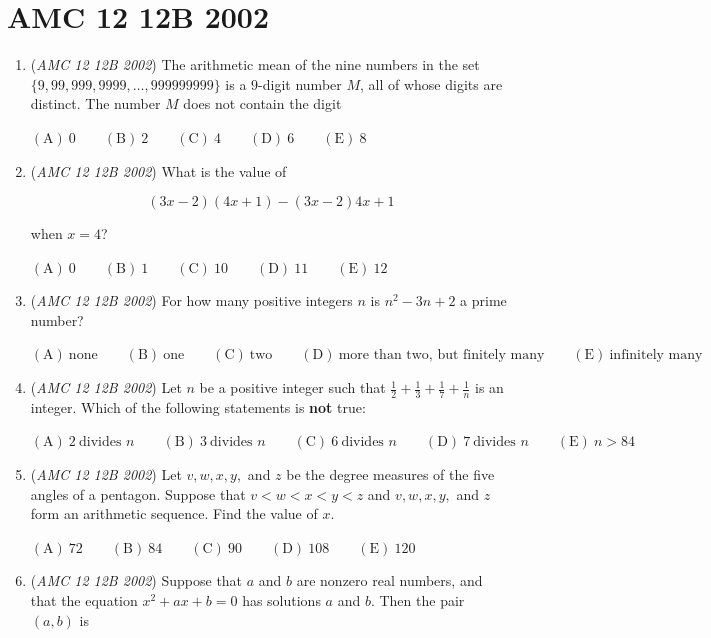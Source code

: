 \section{AMC 12 12B 2002}
        \begin{enumerate}
        	\item (\textit{AMC 12 12B 2002}) The arithmetic mean of the nine numbers in the set $\{9, 99, 999, 9999, \ldots, 999999999\}$ is a $9$-digit number $M$, all of whose digits are distinct. The number $M$ does not contain the digit


 $\mathrm{(A)}\ 0 \qquad\mathrm{(B)}\ 2 \qquad\mathrm{(C)}\ 4 \qquad\mathrm{(D)}\ 6 \qquad\mathrm{(E)}\ 8$


	\item (\textit{AMC 12 12B 2002}) What is the value of 

 \[(3x - 2)(4x + 1) - (3x - 2)4x + 1\]


 when $x=4$?


 $\mathrm{(A)}\ 0 \qquad\mathrm{(B)}\ 1 \qquad\mathrm{(C)}\ 10 \qquad\mathrm{(D)}\ 11 \qquad\mathrm{(E)}\ 12$


	\item (\textit{AMC 12 12B 2002}) For how many positive integers $n$ is $n^2 - 3n + 2$ a prime number?


 $\mathrm{(A)}\ \text{none} \qquad\mathrm{(B)}\ \text{one} \qquad\mathrm{(C)}\ \text{two} \qquad\mathrm{(D)}\ \text{more\ than\ two,\ but\ finitely\ many} \qquad\mathrm{(E)}\ \text{infinitely\ many}$


	\item (\textit{AMC 12 12B 2002}) Let $n$ be a positive integer such that $\frac 12 + \frac 13 + \frac 17 + \frac 1n$ is an integer. Which of the following statements is \textbf{not} true:


 $\mathrm{(A)}\ 2\ \text{divides\ }n \qquad\mathrm{(B)}\ 3\ \text{divides\ }n \qquad\mathrm{(C)}\ 6\ \text{divides\ }n \qquad\mathrm{(D)}\ 7\ \text{divides\ }n \qquad\mathrm{(E)}\ {n > 84}$


	\item (\textit{AMC 12 12B 2002}) Let $v, w, x, y,$ and $z$ be the degree measures of the five angles of a pentagon. Suppose that $v < w < x < y < z$ and $v, w, x, y,$ and $z$ form an arithmetic sequence. Find the value of $x$.


 $\mathrm{(A)}\ 72 \qquad\mathrm{(B)}\ 84 \qquad\mathrm{(C)}\ 90 \qquad\mathrm{(D)}\ 108 \qquad\mathrm{(E)}\ 120$


	\item (\textit{AMC 12 12B 2002}) Suppose that $a$ and $b$ are nonzero real numbers, and that the equation $x^2 + ax + b = 0$ has solutions $a$ and $b$. Then the pair $(a,b)$ is



\end{enumerate}
